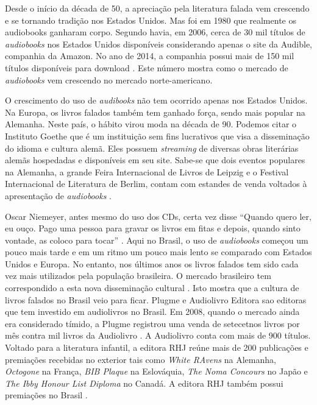 Desde o início da década de 50, a apreciação pela literatura falada vem crescendo e se tornando tradição nos Estados Unidos. Mas foi em 1980 que realmente os audiobooks ganharam corpo. Segundo \cite{teixeira} havia, em 2006, cerca de 30 mil títulos de \textit{audiobooks} nos Estados Unidos disponíveis considerando apenas o site da Audible, companhia da Amazon. No ano de 2014, a companhia possui mais de 150 mil títulos disponíveis para download \cite{audible}. Este número mostra como o mercado de \textit{audiobooks} vem crescendo no mercado norte-americano.

O crescimento do uso de \textit{audibooks} não tem ocorrido apenas nos Estados Unidos. Na Europa, os livros falados também tem ganhado força, sendo mais popular na Alemanha. Neste país, o hábito virou moda na década de 90. Podemos citar o Instituto Goethe que é um instituição sem fins lucrativos que visa a disseminação do idioma e cultura alemã. Eles possuem \textit{streaming} de diversas obras literárias alemãs hospedadas e disponíveis em seu site. Sabe-se que dois eventos populares na Alemanha, a grande Feira Internacional de Livros de Leipzig e o Festival Internacional de Literatura de Berlim, contam com estandes de venda voltados à apresentação de \textit{audiobooks} \cite{dw}.

Oscar Niemeyer, antes mesmo do uso dos CDs, certa vez disse ``Quando quero ler, eu ouço. Pago uma pessoa para gravar os livros em fitas e depois, quando sinto vontade, as coloco para tocar'' \cite{audiobookinovacao}. Aqui no Brasil, o uso de \textit{audiobooks} começou um pouco mais tarde e em um ritmo um pouco mais lento se comparado com Estados Unidos e Europa. No entanto, nos últimos anos os livros falados tem sido cada vez mais utilizados pela população brasileira. O mercado brasileiro tem correspondido a esta nova disseminação cultural \cite{farias}. Isto mostra que a cultura de livros falados no Brasil veio para ficar. Plugme e Audiolivro Editora sao editoras que tem investido em audiolivros no Brasil. Em 2008, quando o mercado ainda era considerado tímido, a Plugme registrou uma venda de setecetnos livros por mês contra mil livros da Audiolivro \cite{audiobooksuporte}. A Audiolivro conta com mais de 900 títulos. Voltado para a literatura infantil, a editora RHJ reúne mais de 200 publicações e premiações recebidas no exterior tais como \textit{White RAvens} na Alemanha, \textit{Octogone} na França, \textit{BIB Plaque} na Eslováquia, \textit{The Noma Concours} no Japão e \textit{The Ibby Honour List Diploma} no Canadá. A editora RHJ também possui premiações no Brasil \cite{rhj}.

